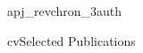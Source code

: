 \documentclass[12pt]{article}
\begin{document}
{apj_revchron_3auth}
%
%
%


{cv}{Selected Publications}


\nopagebreak




%


% 
% 
% 
% 
% 
% 
% 
% 
% 
% 
% 
% 
% 
% 
% 

%



\end{document}
